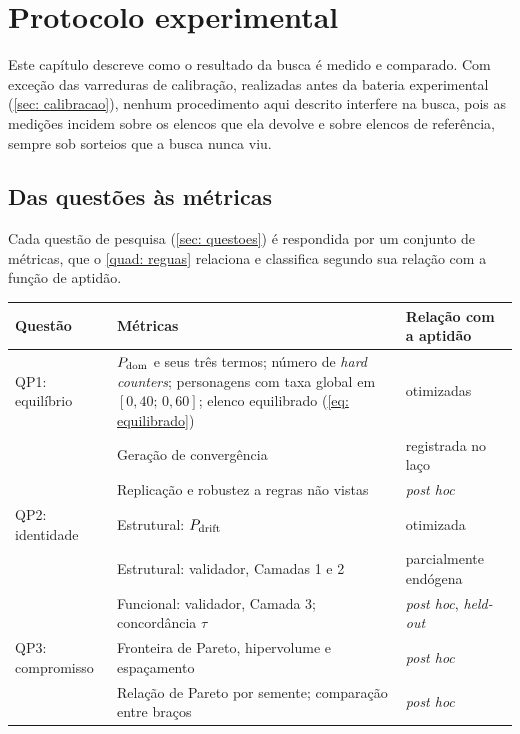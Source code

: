 \chapter[Protocolo experimental]{Protocolo experimental}
\label{chap: protocolo}

Este capítulo descreve como o resultado da busca é medido e comparado. Com exceção das varreduras de calibração, realizadas antes da bateria experimental (\autoref{sec: calibracao}), nenhum procedimento aqui descrito interfere na busca, pois as medições incidem sobre os elencos que ela devolve e sobre elencos de referência, sempre sob sorteios que a busca nunca viu.

\section{Das questões às métricas}
\label{sec: reguas}

Cada questão de pesquisa (\autoref{sec: questoes}) é respondida por um conjunto de métricas, que o \autoref{quad: reguas} relaciona e classifica segundo sua relação com a função de aptidão.

\begin{quadro}[htb]
    \caption{Questões de pesquisa, métricas que as respondem e relação de cada métrica com a aptidão.}
    \label{quad: reguas}
    \centering
    \small
    \begin{tabularx}{\textwidth}{l X l}
        \toprule
        \textbf{Questão} & \textbf{Métricas} & \textbf{Relação com a aptidão} \\
        \midrule
        QP1: equilíbrio & $P_{\mathrm{dom}}$ e seus três termos; número de \textit{hard counters}; personagens com taxa global em $[0{,}40;\, 0{,}60]$; elenco equilibrado (\autoref{eq: equilibrado}) & otimizadas \\
                        & Geração de convergência & registrada no laço \\
                        & Replicação e robustez a regras não vistas & \textit{post hoc} \\
        \midrule
        QP2: identidade & Estrutural: $P_{\mathrm{drift}}$ & otimizada \\
                        & Estrutural: validador, Camadas 1 e 2 & parcialmente endógena \\
                        & Funcional: validador, Camada 3; concordância $\tau$ & \textit{post hoc}, \textit{held-out} \\
        \midrule
        QP3: compromisso & Fronteira de Pareto, hipervolume e espaçamento & \textit{post hoc} \\
                         & Relação de Pareto por semente; comparação entre braços & \textit{post hoc} \\
        \bottomrule
    \end{tabularx}
    \source
\end{quadro}

